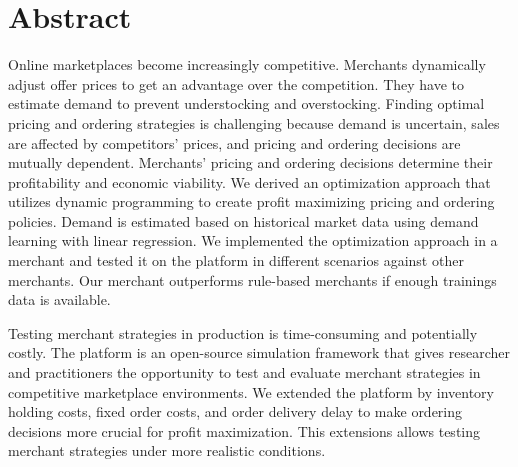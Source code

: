 \chapter*{Abstract}
Online marketplaces become increasingly competitive.
Merchants dynamically adjust offer prices to get an advantage over the competition.
They have to estimate demand to prevent understocking and overstocking.
Finding optimal pricing and ordering strategies is challenging because demand is uncertain, sales are affected by competitors' prices, and pricing and ordering decisions are mutually dependent.
Merchants' pricing and ordering decisions determine their profitability and economic viability.
We derived an optimization approach that utilizes dynamic programming to create profit maximizing pricing and ordering policies.
Demand is estimated based on historical market data using demand learning with linear regression.
We implemented the optimization approach in a merchant and tested it on the \pricewars platform in different scenarios against other merchants.
Our merchant outperforms rule-based merchants if enough trainings data is available.

Testing merchant strategies in production is time-consuming and potentially costly.
The \pricewars platform is an open-source simulation framework that gives researcher and practitioners the opportunity to test and evaluate merchant strategies in competitive marketplace environments.
We extended the platform by inventory holding costs, fixed order costs, and order delivery delay to make ordering decisions more crucial for profit maximization.
This extensions allows testing merchant strategies under more realistic conditions.